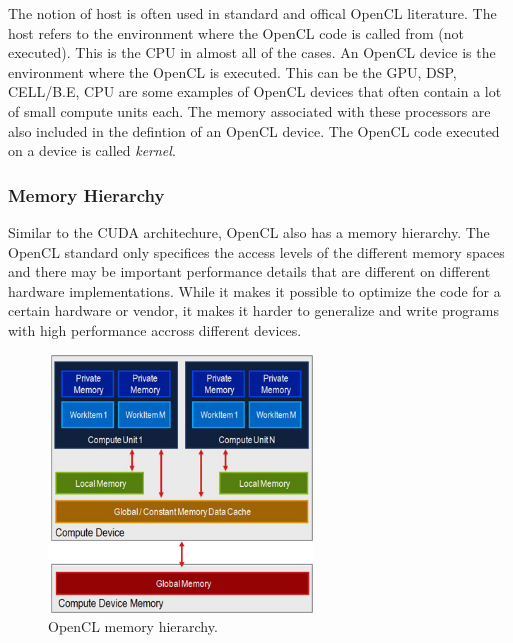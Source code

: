 The notion of host is often used in standard and offical OpenCL literature. The host refers to the environment where the OpenCL code is called from (not executed). This is the CPU in almost all of the cases. An OpenCL device is the environment where the OpenCL is executed. This can be the GPU, DSP, CELL/B.E, CPU are some examples of OpenCL devices that often contain a lot of small compute units each. The memory associated with these processors are also included in the defintion of an OpenCL device. The OpenCL code executed on a device is called \emph{kernel}.
\newline

\subsubsection{Memory Hierarchy}

Similar to the CUDA architechure, OpenCL also has a memory hierarchy. The OpenCL standard only specifices the access levels of the different memory spaces and there may be important performance details that are different on different hardware implementations. While it makes it possible to optimize the code for a certain hardware or vendor, it makes it harder to generalize and write programs with high performance accross different devices. 

\begin{figure}[ht!]
\centering
\includegraphics[width=70mm]{img/mem-cl.jpg}
\caption{OpenCL memory hierarchy.}
\label{cl-mem}
\end{figure}


